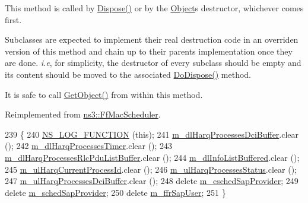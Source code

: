 This method is called by \hyperlink{classns3_1_1Object_aa90ae598863f6c251cdab3c3722afdaf}{Dispose()} or by the \hyperlink{classns3_1_1Object}{Object}\textquotesingle{}s destructor, whichever comes first.

Subclasses are expected to implement their real destruction code in an overriden version of this method and chain up to their parent\textquotesingle{}s implementation once they are done. {\itshape i.\+e}, for simplicity, the destructor of every subclass should be empty and its content should be moved to the associated \hyperlink{classns3_1_1PssFfMacScheduler_aef17051a95160a1b1239430c1f5b942b}{Do\+Dispose()} method.

It is safe to call \hyperlink{classns3_1_1Object_a13e18c00017096c8381eb651d5bd0783}{Get\+Object()} from within this method. 

Reimplemented from \hyperlink{classns3_1_1FfMacScheduler_a771411e455992b81d8399681779debd9}{ns3\+::\+Ff\+Mac\+Scheduler}.


\begin{DoxyCode}
239 \{
240   \hyperlink{log-macros-disabled_8h_a90b90d5bad1f39cb1b64923ea94c0761}{NS\_LOG\_FUNCTION} (\textcolor{keyword}{this});
241   \hyperlink{classns3_1_1PssFfMacScheduler_a167441dd2a0e5cde664eedfd19a07fbf}{m\_dlHarqProcessesDciBuffer}.clear ();
242   \hyperlink{classns3_1_1PssFfMacScheduler_afcae17e3f08b0a6f1e1458a39da8cdcb}{m\_dlHarqProcessesTimer}.clear ();
243   \hyperlink{classns3_1_1PssFfMacScheduler_a0f31f16c2a9f067c6189462a9797e06b}{m\_dlHarqProcessesRlcPduListBuffer}.clear ();
244   \hyperlink{classns3_1_1PssFfMacScheduler_a3a7d9c7460c66767201d15a1d6f58758}{m\_dlInfoListBuffered}.clear ();
245   \hyperlink{classns3_1_1PssFfMacScheduler_a9e2a7c8f3e5e48aa429a5a06f4f70a72}{m\_ulHarqCurrentProcessId}.clear ();
246   \hyperlink{classns3_1_1PssFfMacScheduler_a80badd341a079bd237ef7fe60db2cb79}{m\_ulHarqProcessesStatus}.clear ();
247   \hyperlink{classns3_1_1PssFfMacScheduler_adfb2ba26a401807d40208e7b8f01f813}{m\_ulHarqProcessesDciBuffer}.clear ();
248   \textcolor{keyword}{delete} \hyperlink{classns3_1_1PssFfMacScheduler_ac11b1d69f7082523bec1759f39331619}{m\_cschedSapProvider};
249   \textcolor{keyword}{delete} \hyperlink{classns3_1_1PssFfMacScheduler_a9c95ea6430238a972ca249cc7c017a91}{m\_schedSapProvider};
250   \textcolor{keyword}{delete} \hyperlink{classns3_1_1PssFfMacScheduler_aba075c2fcb5d36a9276a0519a53ad5b2}{m\_ffrSapUser};
251 \}
\end{DoxyCode}
